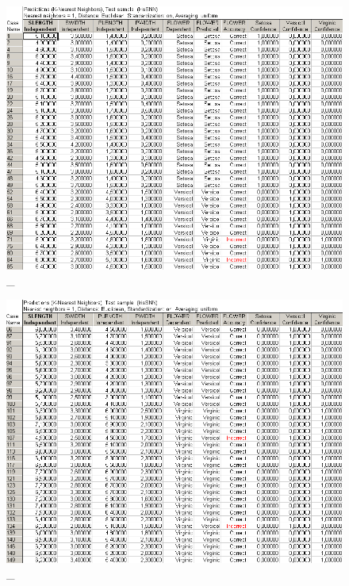 \begin{figure}[!hp]
  \centering

  \includegraphics[width=14cm]
  {inc/ex_20.PNG}

  \caption{\_}

  \label{fig:17}
\end{figure}

\begin{figure}[!hp]
  \centering

  \includegraphics[width=14cm]
  {inc/ex_21.PNG}

  \caption{\_}

  \label{fig:18}
\end{figure}

